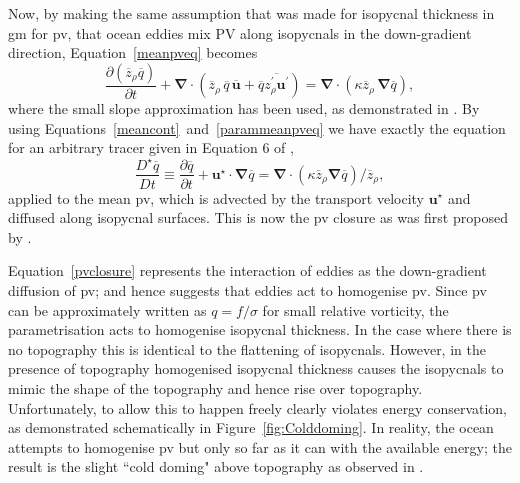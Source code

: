 \documentclass[12pt,a4paper]{report}
\newcommand*\mean[1]{\overline{#1}}
\newcommand*\res[1]{{#1}^{\prime}}
\newcommand*\figref[1]{Figure~\ref{#1}}
\newcommand*\equref[1]{Equation~\eqref{#1}}
\begin{document}
                Now, by making the same assumption that was made for isopycnal thickness in 
                \gls{gm} for \gls{pv}, that ocean eddies mix PV along isopycnals in the down-gradient direction, \equref{meanpveq} becomes
                \begin{equation}
                \frac{\partial \left(\mean{z}_{\rho} \mean{q}\right)}{\partial t} +
                \boldsymbol{\nabla}\cdot\left(\mean{z}_{\rho}\,\mean{q}\,\mean{\boldsymbol{u}}+\mean{q}\mean{\res{z}_{\rho} \res{\boldsymbol{u}}}\right)
                = \boldsymbol{\nabla}\cdot\left(\kappa \mean{z}_{\rho}\,\boldsymbol{\nabla}\mean{q}\right) ,
                \label{parammeanpveq}
                \end{equation}
                where the small slope approximation has been used, as demonstrated in
                \cite{gent1990}. By using Equations~\ref{meancont}~and~\ref{parammeanpveq} we have exactly the equation for an arbitrary tracer given in Equation 6 of \cite{gent1995parameterizing},
                \begin{equation}
                \frac{D^\star \mean{q}}{D t}\equiv\frac{\partial \mean{q}}{\partial t} + \boldsymbol{u}^\star\cdot\boldsymbol{\nabla}\mean{q} = \boldsymbol{\nabla}\cdot
                \left(\kappa \mean{z}_{\rho}\boldsymbol{\nabla} \mean{q} \right)/\mean{z}_{\rho} ,
                \label{pvclosure}
                \end{equation}
                applied to the mean \gls{pv}, which is advected by the transport velocity $\boldsymbol{u}^\star$ and diffused along isopycnal surfaces. This is now
                the \gls{pv} closure as was first proposed by \cite{greatbatch1998exploring}.
                
                \equref{pvclosure} represents the interaction of eddies as the
                down-gradient diffusion of \gls{pv}; and hence suggests that eddies
                act to homogenise \gls{pv}. Since \gls{pv} can be approximately written
                as $q=f/\sigma$ for small relative vorticity, the parametrisation acts  to homogenise isopycnal thickness. In the case 
                where there is no topography this is identical to the flattening of isopycnals.
                However, in the presence of topography homogenised isopycnal thickness
                causes the isopycnals to mimic the shape of the topography and hence 
                rise over topography. Unfortunately, to allow this to happen freely
                clearly violates energy conservation, as demonstrated schematically in 
                \figref{fig:Colddoming}. In reality, the ocean attempts to 
                homogenise \gls{pv} but only so far as it can with the available energy;
                the result is the slight ``cold doming" above topography as observed in
                \cite{adcock2000interactions}. 
                
\end{document}
